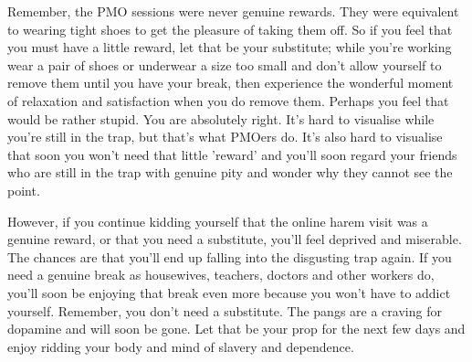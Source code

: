 \documentclass[easypeasy.tex]{subfiles}
\begin{document}
Remember, the PMO sessions were never genuine rewards. They were equivalent to wearing tight shoes to get the pleasure of taking them off. So if you feel that you must have a little reward, let that be your substitute; while you're working wear a pair of shoes or underwear a size too small and don't allow yourself to remove them until you have your break, then experience the wonderful moment of relaxation and satisfaction when you do remove them. Perhaps you feel that would be rather stupid. You are absolutely right. It's hard to visualise while you're still in the trap, but that's what PMOers do. It's also hard to visualise that soon you won't need that little 'reward' and you'll soon regard your friends who are still in the trap with genuine pity and wonder why they cannot see the point.

However, if you continue kidding yourself that the online harem visit was a genuine reward, or that you need a substitute, you'll feel deprived and miserable. The chances are that you'll end up falling into the disgusting trap again. If you need a genuine break as housewives, teachers, doctors and other workers do, you'll soon be enjoying that break even more because you won't have to addict yourself. Remember, you don't need a substitute. The pangs are a craving for dopamine and will soon be gone. Let that be your prop for the next few days and enjoy ridding your body and mind of slavery and dependence.
\end{document}
